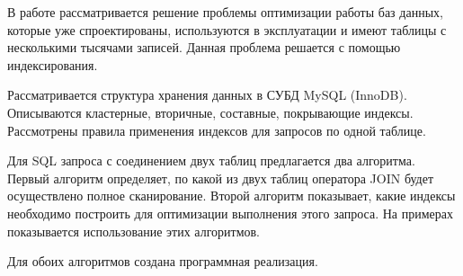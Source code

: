 \Introduction

В работе рассматривается решение проблемы оптимизации работы баз данных, которые уже спроектированы, используются в эксплуатации и имеют таблицы с несколькими тысячами записей. Данная проблема решается с помощью индексирования. 

Рассматривается структура хранения данных в СУБД MySQL (InnoDB). Описываются кластерные, вторичные, составные, покрывающие индексы. Рассмотрены правила применения индексов для запросов по одной таблице. 

Для SQL запроса с соединением двух таблиц предлагается два алгоритма. Первый алгоритм определяет, по какой из двух таблиц оператора JOIN будет осуществлено полное сканирование. Второй алгоритм показывает, какие индексы необходимо построить для оптимизации выполнения этого запроса. На примерах показывается использование этих алгоритмов. 

Для обоих алгоритмов создана программная реализация.
